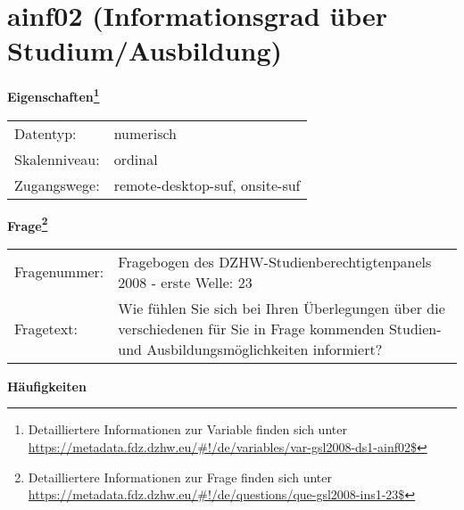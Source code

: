 
    \setcounter{footnote}{0}

    \vspace*{-1.8cm}
	\section{ainf02 (Informationsgrad über Studium/Ausbildung)}
	\label{section:ainf02}



    \vspace*{0.5cm}
    \noindent\textbf{Eigenschaften\footnote{Detailliertere Informationen zur Variable finden sich unter
		\url{https://metadata.fdz.dzhw.eu/\#!/de/variables/var-gsl2008-ds1-ainf02$}}}\\
	\begin{tabularx}{\hsize}{@{}lX}
	Datentyp: & numerisch \\
	Skalenniveau: & ordinal \\
	Zugangswege: &
	  remote-desktop-suf, 
	  onsite-suf
 \\
    \end{tabularx}



				\vspace*{0.5cm}
                \noindent\textbf{Frage\footnote{Detailliertere Informationen zur Frage finden sich unter
		              \url{https://metadata.fdz.dzhw.eu/\#!/de/questions/que-gsl2008-ins1-23$}}}\\
				\begin{tabularx}{\hsize}{@{}lX}
					Fragenummer: &
					  Fragebogen des DZHW-Studienberechtigtenpanels 2008 - erste Welle:
					  23
 \\
					Fragetext: & Wie fühlen Sie sich bei Ihren Überlegungen über die verschiedenen für Sie in Frage kommenden Studien- und Ausbildungsmöglichkeiten informiert? \\
				\end{tabularx}





        		\vspace*{0.5cm}
                \noindent\textbf{Häufigkeiten}

